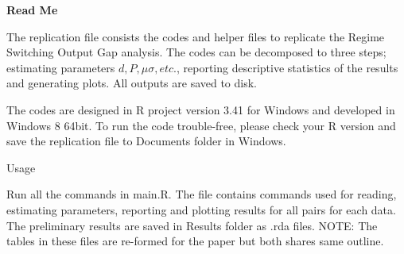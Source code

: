 \documentclass{article}
\begin{document}
\begin{center}
	\Large \bf Read Me 
\end{center}
The replication file consists the codes and helper files to replicate the Regime Switching Output Gap analysis. The codes can be decomposed to three steps; estimating parameters $ d,P,\mu\sigma, etc. $, reporting descriptive statistics of the results and generating plots. All outputs are saved to disk.

The codes are designed in R project version 3.41 for Windows and developed in Windows 8 64bit. To run the code trouble-free, please check your R version and save the replication file to Documents folder in Windows.

\begin{flushleft}
	\large Usage
\end{flushleft}
Run all the commands in main.R. The file contains commands used for reading, estimating parameters, reporting and plotting results for all pairs for each data. The preliminary results are saved in Results folder as .rda files. NOTE: The tables in these files are re-formed for the paper but both shares same outline.
\end{document}
